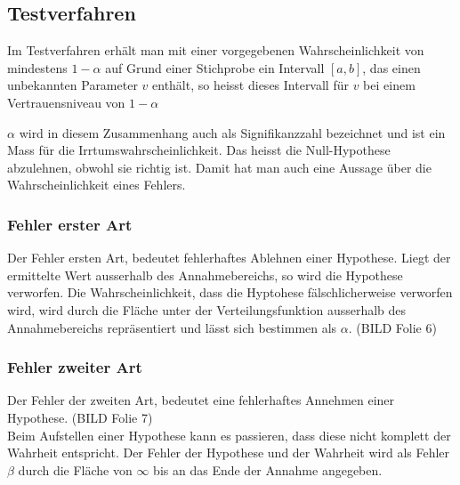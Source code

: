 \subsection{Testverfahren}
\begin{tcolorbox}[colback=green!5,colframe=green!40!black, title=Definition Testverfahren]
Im Testverfahren erhält man mit einer vorgegebenen Wahrscheinlichkeit von mindestens $1-\alpha$ auf Grund einer Stichprobe ein Intervall $[a,b]$, das einen unbekannten Parameter $v$ enthält, so heisst dieses Intervall für $v$ bei einem Vertrauensniveau von $1-\alpha$
\end{tcolorbox}
$\alpha$ wird in diesem Zusammenhang auch als Signifikanzzahl bezeichnet und ist ein Mass für die Irrtumswahrscheinlichkeit. Das heisst die Null-Hypothese abzulehnen, obwohl sie richtig ist. Damit hat man auch eine Aussage über die Wahrscheinlichkeit eines Fehlers.
\subsubsection{Fehler erster Art}
Der Fehler ersten Art, bedeutet fehlerhaftes Ablehnen einer Hypothese. Liegt der ermittelte Wert ausserhalb des Annahmebereichs, so wird die Hypothese verworfen. Die Wahrscheinlichkeit, dass die Hyptohese fälschlicherweise verworfen wird, wird durch die Fläche unter der Verteilungsfunktion ausserhalb des Annahmebereichs repräsentiert und lässt sich bestimmen als $\alpha$.
(BILD Folie 6)
\subsubsection{Fehler zweiter Art}
Der Fehler der zweiten Art, bedeutet eine fehlerhaftes Annehmen einer Hypothese. 
(BILD Folie 7)\\
Beim Aufstellen einer Hypothese kann es passieren, dass diese nicht komplett der Wahrheit entspricht. Der Fehler der Hypothese und der Wahrheit wird als Fehler $\beta$ durch die Fläche von $\infty$ bis an das Ende der Annahme angegeben.
